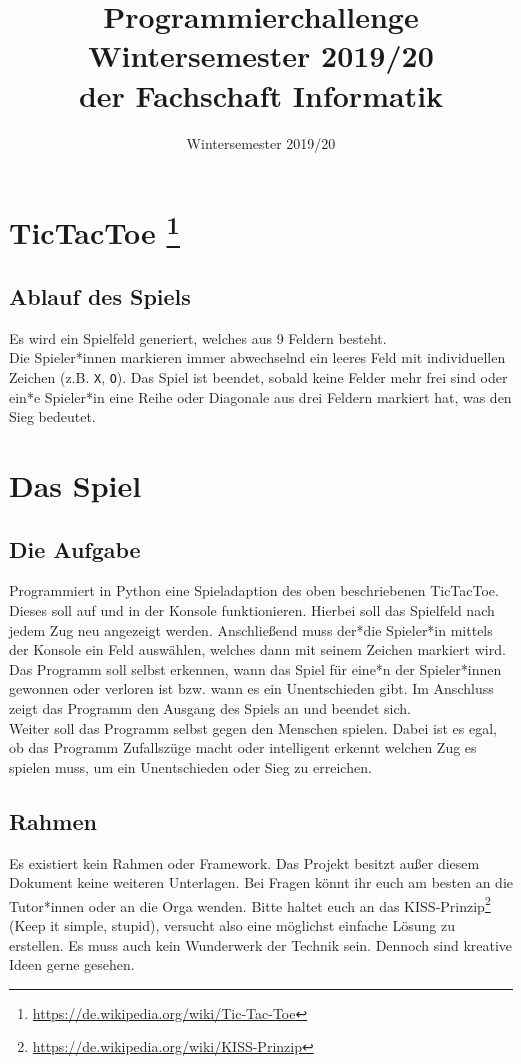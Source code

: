 \documentclass[accentcolor=tud3c,colorbacktitle,12pt]{tudexercise}
\begin{document}
\title{Programmierchallenge Wintersemester 2019/20 \\ {\small der Fachschaft Informatik}}
\subtitle{Wintersemester 2019/20}
\maketitle 
	
	\section*{TicTacToe \footnote[1]{\url{https://de.wikipedia.org/wiki/Tic-Tac-Toe}}}
	\subsection*{Ablauf des Spiels}
	Es wird ein Spielfeld generiert, welches aus 9 Feldern besteht. \\
	
	Die Spieler*innen markieren immer abwechselnd ein leeres Feld mit individuellen Zeichen (z.B. \texttt{X}, \texttt{O}). Das Spiel ist beendet, sobald keine Felder mehr frei sind oder ein*e Spieler*in eine Reihe oder Diagonale aus drei Feldern markiert hat, was den Sieg bedeutet. \\
	
	
	\section*{Das Spiel}
	\subsection*{Die Aufgabe}
	Programmiert in Python eine Spieladaption des oben beschriebenen TicTacToe. Dieses soll auf und in der Konsole funktionieren. Hierbei soll das Spielfeld nach jedem Zug neu angezeigt werden. Anschließend muss der*die Spieler*in mittels der Konsole ein Feld auswählen, welches dann mit seinem Zeichen markiert wird. \\
	Das Programm soll selbst erkennen, wann das Spiel für eine*n der Spieler*innen gewonnen oder verloren ist bzw. wann es ein Unentschieden gibt. Im Anschluss zeigt das Programm den Ausgang des Spiels an und beendet sich. \\
	Weiter soll das Programm selbst gegen den Menschen spielen. Dabei ist es egal, ob das Programm Zufallszüge macht oder intelligent erkennt welchen Zug es spielen muss, um ein Unentschieden oder Sieg zu erreichen.  
	
	\subsection*{Rahmen}
	Es existiert kein Rahmen oder Framework. Das Projekt besitzt außer diesem Dokument keine weiteren Unterlagen. Bei Fragen könnt ihr euch am besten an die Tutor*innen oder an die Orga wenden. Bitte haltet euch an das KISS-Prinzip\footnote[2]{\url{https://de.wikipedia.org/wiki/KISS-Prinzip}} (Keep it simple, stupid), versucht also eine möglichst einfache Lösung zu erstellen. Es muss auch kein Wunderwerk der Technik sein. Dennoch sind kreative Ideen gerne gesehen.
	
\end{document}
